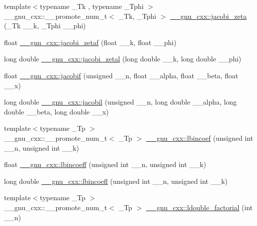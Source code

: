 \begin{DoxyCompactItemize}
\item 
{\footnotesize template$<$typename \+\_\+\+Tk , typename \+\_\+\+Tphi $>$ }\\\+\_\+\+\_\+gnu\+\_\+cxx\+::\+\_\+\+\_\+promote\+\_\+num\+\_\+t$<$ \+\_\+\+Tk, \+\_\+\+Tphi $>$ \hyperlink{group__gnu__math__spec__func_gae22f0fc0fa1cac3bd0d3b3a4b2c33e7e}{\+\_\+\+\_\+gnu\+\_\+cxx\+::jacobi\+\_\+zeta} (\+\_\+\+Tk \+\_\+\+\_\+k, \+\_\+\+Tphi \+\_\+\+\_\+phi)
\item 
float \hyperlink{group__gnu__math__spec__func_gaedb6b352331c67b9dea73660e2045668}{\+\_\+\+\_\+gnu\+\_\+cxx\+::jacobi\+\_\+zetaf} (float \+\_\+\+\_\+k, float \+\_\+\+\_\+phi)
\item 
long double \hyperlink{group__gnu__math__spec__func_ga9db158df9459aa12c840724338753913}{\+\_\+\+\_\+gnu\+\_\+cxx\+::jacobi\+\_\+zetal} (long double \+\_\+\+\_\+k, long double \+\_\+\+\_\+phi)
\item 
float \hyperlink{group__gnu__math__spec__func_ga450db12e06d6993d169afab5b3f6d0b8}{\+\_\+\+\_\+gnu\+\_\+cxx\+::jacobif} (unsigned \+\_\+\+\_\+n, float \+\_\+\+\_\+alpha, float \+\_\+\+\_\+beta, float \+\_\+\+\_\+x)
\item 
long double \hyperlink{group__gnu__math__spec__func_ga2898a5ebf451eaf259ecfcdd171aa72b}{\+\_\+\+\_\+gnu\+\_\+cxx\+::jacobil} (unsigned \+\_\+\+\_\+n, long double \+\_\+\+\_\+alpha, long double \+\_\+\+\_\+beta, long double \+\_\+\+\_\+x)
\item 
{\footnotesize template$<$typename \+\_\+\+Tp $>$ }\\\+\_\+\+\_\+gnu\+\_\+cxx\+::\+\_\+\+\_\+promote\+\_\+num\+\_\+t$<$ \+\_\+\+Tp $>$ \hyperlink{group__gnu__math__spec__func_gab3eab510cd484f6ec75e968b1d98b818}{\+\_\+\+\_\+gnu\+\_\+cxx\+::lbincoef} (unsigned int \+\_\+\+\_\+n, unsigned int \+\_\+\+\_\+k)
\item 
float \hyperlink{group__gnu__math__spec__func_gab48439faacd87f02d088a04e7cee0853}{\+\_\+\+\_\+gnu\+\_\+cxx\+::lbincoeff} (unsigned int \+\_\+\+\_\+n, unsigned int \+\_\+\+\_\+k)
\item 
long double \hyperlink{group__gnu__math__spec__func_gab5b5d92a2a522aaef999106f5d602163}{\+\_\+\+\_\+gnu\+\_\+cxx\+::lbincoefl} (unsigned int \+\_\+\+\_\+n, unsigned int \+\_\+\+\_\+k)
\item 
{\footnotesize template$<$typename \+\_\+\+Tp $>$ }\\\+\_\+\+\_\+gnu\+\_\+cxx\+::\+\_\+\+\_\+promote\+\_\+num\+\_\+t$<$ \+\_\+\+Tp $>$ \hyperlink{group__gnu__math__spec__func_gac97a4a380940765948e0663fbc119544}{\+\_\+\+\_\+gnu\+\_\+cxx\+::ldouble\+\_\+factorial} (int \+\_\+\+\_\+n)

\end{DoxyCompactItemize}
